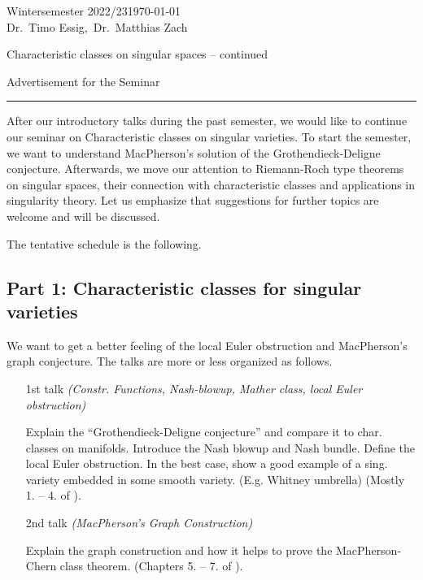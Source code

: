 \documentclass[a4paper]{article}
\newcommand{\MODULNAME}{Characteristic classes on singular spaces -- continued}
\newcommand{\DOZENT}{Dr.~Timo Essig,~Dr.~Matthias Zach}
\newcommand{\SEMESTER}{Wintersemester 2022/23}
\newcommand{\DATUM}{\today}
\begin{document}
\SEMESTER \hfill \DATUM \\
\DOZENT

\bigskip

\begin{center}
  {\Large\MODULNAME 

  \vspace{1ex}
  Advertisement for the Seminar}
\end{center}
\rule{\textwidth}{1pt}




After our introductory talks during the past semester, we would like to 
continue our seminar on Characteristic classes on singular varieties. 
To start the semester, we want to understand MacPherson's solution of the
Grothendieck-Deligne conjecture.
Afterwards, we move our attention to Riemann-Roch type theorems on singular spaces,
their connection with characteristic classes and applications in singularity theory.
Let us emphasize that suggestions for further topics are welcome and will be discussed.

The tentative schedule is the following.

\subsection*{Part 1: Characteristic classes for singular varieties}
We want to get a better feeling of the local Euler obstruction and MacPherson's graph conjecture.
The talks are more or less organized as follows.
\begin{enumerate}
	\item[1st talk] \emph{(Constr. Functions, Nash-blowup, Mather class, local Euler obstruction)}

    Explain the ``Grothendieck-Deligne conjecture'' and compare it to char. 
    classes on manifolds. Introduce the Nash blowup and Nash bundle.
    Define the local Euler obstruction. In the best case,
    show a good example of a sing. variety embedded in some smooth variety.
    (E.g. Whitney umbrella) (Mostly 1. -- 4. of \cite{MacPherson74}).
\item[2nd talk] \emph{(MacPherson's Graph Construction)}

	Explain the graph construction and how it helps to prove the MacPherson-Chern 
class theorem. (Chapters 5. -- 7. of \cite{MacPherson74}).
\end{enumerate}
\end{document}
